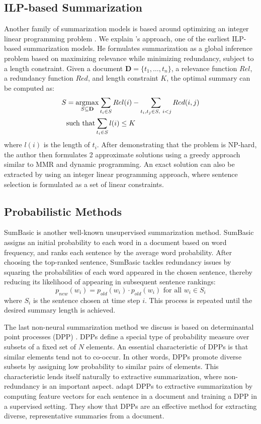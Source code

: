 \subsection{ILP-based Summarization}
Another family of summarization models is based around optimizing an integer linear programming problem \parencite{mcdonald2007study,clarke2008global,ilp-gillick}. We explain \cite{mcdonald2007study}'s approach, one of the earliest ILP-based summarization models. He formulates summarization as a global inference problem based on maximizing relevance while minimizing redundancy, subject to a length constraint. Given a document $\mathbf{D} = \{t_1,\dots,t_n\}$, a relevance function $Rel$, a redundancy function $Red$, and length constraint $K$, the optimal summary can be computed as:
\begin{align}
    S &= \operatorname*{\arg\!\max}_{S \subseteq \mathbf{D}} \sum_{t_i \in S} Rel(i) - \sum_{t_i,t_j \in S,\ i < j} Red(i,j) \\
    &\text{such that} \sum_{t_i \in S} l(i) \leq K
\end{align}
where $l(i)$ is the length of $t_i$. After demonstrating that the problem is NP-hard, the author then formulates 2 approximate solutions using a greedy approach similar to MMR and dynamic programming. An exact solution can also be extracted by using an integer linear programming approach, where sentence selection is formulated as a set of linear constraints.

\subsection{Probabilistic Methods}
SumBasic \parencite{sumbasic} is another well-known unsupervised summarization method. SumBasic assigns an initial probability to each word in a document based on word frequency, and ranks each sentence by the average word probability. After choosing the top-ranked sentence, SumBasic tackles redundancy issues by squaring the probabilities of each word appeared in the chosen sentence, thereby reducing its likelihood of appearing in subsequent sentence rankings:
\begin{equation}
    p_{new}(w_i) = p_{old}(w_i)\cdot p_{old}(w_i) \text{ for all } w_i \in S_i
\end{equation}
where $S_i$ is the sentence chosen at time step $i$. This process is repeated until the desired summary length is achieved.

The last non-neural summarization method we discuss is based on determinantal point processes (DPP) \parencite{kulesza2012determinantal}. DPPs define a special type of probability measure over subsets of a fixed set of $N$ elements. An essential characteristic of DPPs is that similar elements tend not to co-occur. In other words, DPPs promote diverse subsets by assigning low probability to similar pairs of elements. This characteristic lends itself naturally to extractive summarization, where non-redundancy is an important aspect. \cite{kulesza2012determinantal} adapt DPPs to extractive summarization by computing feature vectors for each sentence in a document and training a DPP in a supervised setting. They show that DPPs are an effective method for extracting diverse, representative summaries from a document.

